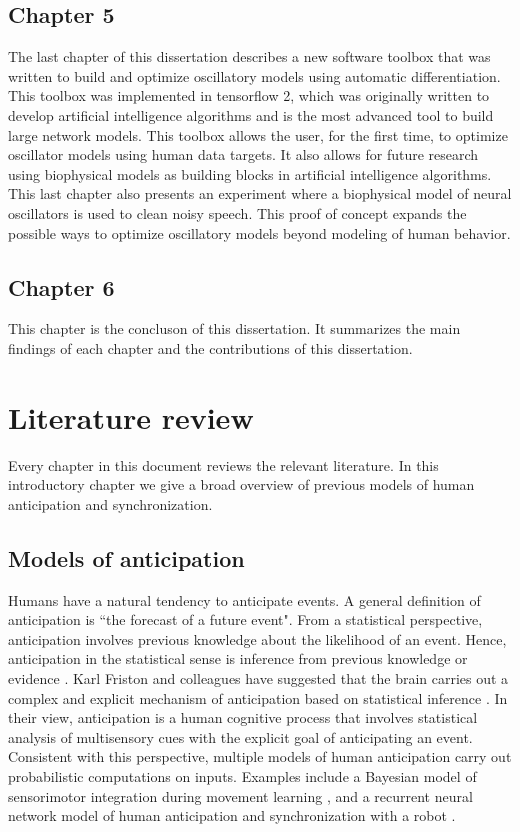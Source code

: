 \documentclass{report}
\begin{document}
\subsection{Chapter 5}
The last chapter of this dissertation describes a new software toolbox that was written to build and optimize oscillatory models using automatic differentiation. This toolbox was implemented in tensorflow 2, which was originally written to develop artificial intelligence algorithms and is the most advanced tool to build large network models. This toolbox allows the user, for the first time, to optimize oscillator models using human data targets. It also allows for future research using biophysical models as building blocks in artificial intelligence algorithms. This last chapter also presents an experiment where a biophysical model of neural oscillators is used to clean noisy speech. This proof of concept expands the possible ways to optimize oscillatory models beyond modeling of human behavior. 

\subsection{Chapter 6}
This chapter is the concluson of this dissertation. It summarizes the main findings of each chapter and the contributions of this dissertation.

\section{Literature review}

Every chapter in this document reviews the relevant literature. In this introductory chapter we give a broad overview of previous models of human anticipation and synchronization.

\subsection{Models of anticipation}
Humans have a natural tendency to anticipate events. A general definition of anticipation is ``the forecast of a future event". From a statistical perspective, anticipation involves previous knowledge about the likelihood of an event. Hence, anticipation in the statistical sense is inference from previous knowledge or evidence \cite{cox2006principles}. Karl Friston and colleagues have suggested that the brain carries out a complex and explicit mechanism of anticipation based on statistical inference \cite{maffei2017perceptual}. In their view, anticipation is a human cognitive process that involves statistical analysis of multisensory cues with the explicit goal of anticipating an event. Consistent with this perspective, multiple models of human anticipation carry out probabilistic computations on inputs. Examples include a Bayesian model of sensorimotor integration during movement learning \cite{kording2004bayesian}, and a recurrent neural network model of human anticipation and synchronization with a robot \cite{schydlo2018anticipation}. 
\end{document}
